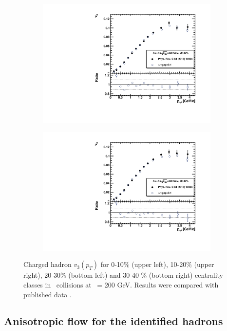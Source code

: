 \begin{figure}[ht]
\begin{subfigure}{.49\textwidth}
        \includegraphics[width=1.\linewidth]{Figures/v3_charged_hadrons_pt_cent2.pdf}
    \end{subfigure}
    \begin{subfigure}{.49\textwidth}
        \centering
        \includegraphics[width=1.\linewidth]{Figures/v3_charged_hadrons_pt_cent3.pdf}
    \end{subfigure}
    \label{fig:v3_EP_CH}
    \caption{Charged hadron $v_3(p_T)$ for 0-10\% (upper left), 10-20\% (upper right), 20-30\% (bottom left) and 30-40 \% (bottom right) centrality classes in \AuAu\ collisions at \sNN\ = 200 GeV. Results were compared with published data \cite{Adamczyk:2013waa}.}
\end{figure}

\FloatBarrier
\subsection{Anisotropic flow for the identified hadrons}

